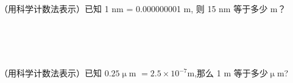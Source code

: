 \begin{comment}
    \item{
        化简: $(-a-b)^{2n}$ ($n$为整数).
    }
    \\ \\ \\
    \item{
        化简: $(-a-b)^{2n+1}$ ($n$为整数).
    }
    \\ \\ \\
\end{comment}

\item{
    （用科学计数法表示）已知 1 nm = 0.000000001 m, 则 15 nm 等于多少 m？
    \iffalse
    \fangsong\zihao{4}
    解答: 

    \textcircled{1} 写出换算关系
    \begin{align*}
        1 \rm{nm} &= 10^{-9} \rm{m}
    \end{align*}
    \textcircled{2} 两边同时乘15
    \begin{align*}
        15 \rm{nm} &= 15 \times 10^{-9} \rm{m}\\
        &= 1.5\times 10^{-8} \rm{m}.
    \end{align*}
    \fi
}
\\ \\ \\

\begin{comment}
    \item{
        （用科学计数法表示）肥皂泡表面厚度大约是 0.0007 mm,换算成以米为单位是多少？
        \iffalse
        \fangsong\zihao{4}
        解答: 

        \textcircled{1} 写出换算关系
        \begin{align*}
            1 \rm{mm} &= 10^{-3} \rm{m}
        \end{align*}
        \textcircled{2} 两边同时乘0.0007
        \begin{align*}
            0.0007 \rm{mm} &= 0.0007 \times 10^{-3} \rm{m}\\
            &= 7\times 10^{-7} \rm{m}.
        \end{align*}
        \fi
    }
    \\ \\ \\
\end{comment}

\item{
    （用科学计数法表示）已知 $0.25 \upmu$m $ = 2.5\times 10^{-7}$m,那么 1 m 等于多少$\upmu$m?
    \iffalse
    \fangsong\zihao{4}
    思路: 将题中给出的换算关系两边同时除以 $2.5\times 10^{-7}$,右边就出现了 1m.

    解答: 
    \begin{align*}
        \frac{0.25}{2.5\times 10^{-7}} \rm{\upmu m} &= 1\rm{m}\\
        10^6 \rm{\upmu m} &= 1\rm{m}\\
        1\rm{m} &= 10^6 \rm{\upmu m}.
    \end{align*}
    \fi
}
\\ \\ \\


